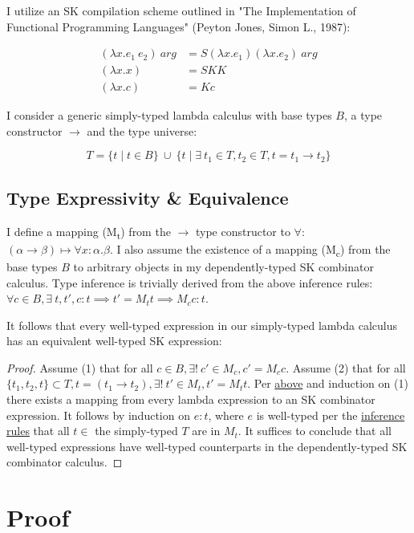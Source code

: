 \documentclass[11pt]{article}
\begin{document}
I utilize an SK compilation scheme outlined in "The Implementation of Functional Programming Languages" (Peyton Jones, Simon L., 1987):

\begin{align}
(\lambda x.e_{1}\ e_{2})\ arg &= S (\lambda x.e_{1}) (\lambda x.e_{2})\ arg \\
(\lambda x.x) &= SKK \\
(\lambda x.c) &= K c
\end{align}

I consider a generic simply-typed lambda calculus with base types \(B\), a type constructor \(\rightarrow\) and the type universe:

\[
T = \{ t \mid t \in B\}\ \cup\ \{ t \mid \exists\  t_{1} \in T, t_{2} \in T, t = t_{1} \rightarrow t_{2} \}
\]

\label{maplemma:1}
\subsection{Type Expressivity \& Equivalence}
\label{sec:orgc25750d}

I define a mapping (M\textsubscript{t}) from the \(\rightarrow\) type constructor to \(\forall\): \((\alpha \rightarrow \beta) \mapsto \forall x : \alpha.\beta\). I also assume the existence of a mapping (M\textsubscript{c}) from the base types \(B\) to arbitrary objects in my dependently-typed SK combinator calculus. Type inference is trivially derived from the above inference rules: \(\forall c \in B, \exists\ t, t', c : t \implies t' = M_{t} t \implies M_{c} c : t\).

It follows that every well-typed expression in our simply-typed lambda calculus has an equivalent well-typed SK expression:

\begin{proof}
Assume (1) that for all $c \in B, \exists!\ c' \in M_{c}, c' = M_{c} c$.
Assume (2) that for all $\{t_{1}, t_{2}, t\} \subset T, t = (t_{1} \rightarrow t_{2}), \exists!\ t' \in M_{t}, t' = M_{t} t$.
Per \href{decomplemma:1}{above} and induction on (1) there exists a mapping from every lambda expression to an SK combinator expression.
It follows by induction on $e : t$, where $e$ is well-typed per the \href{decomplemma:1}{inference rules} that all $t \in$ the simply-typed $T$ are in $M_{t}$.
It suffices to conclude that all well-typed expressions have well-typed counterparts in the dependently-typed SK combinator calculus.
\end{proof}
\section{Proof}
\label{sec:org93675b2}
\end{document}

